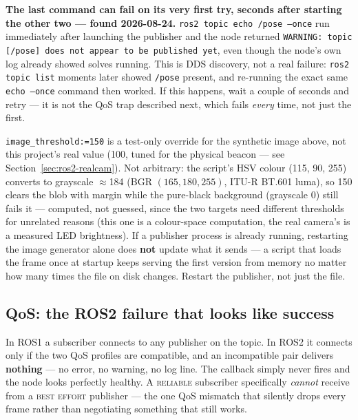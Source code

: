 \documentclass[11pt]{report}
\newenvironment{warningbox}%
  {\begin{lrbox}{\warnbox}\begin{minipage}{0.90\textwidth}}%
  {\end{minipage}\end{lrbox}%
   \begin{center}\fcolorbox{black}{codebg}{\usebox{\warnbox}}\end{center}}
\begin{document}
\begin{warningbox}
\textbf{The last command can fail on its very first try, seconds after
starting the other two --- found 2026-08-24.} \texttt{ros2 topic echo /pose
--once} run immediately after launching the publisher and the node
returned \texttt{WARNING: topic [/pose] does not appear to be published
yet}, even though the node's own log already showed solves running. This
is DDS discovery, not a real failure: \texttt{ros2 topic list} moments
later showed \texttt{/pose} present, and re-running the exact same
\texttt{echo --once} command then worked. If this happens, wait a couple of
seconds and retry --- it is not the QoS trap described next, which fails
\emph{every} time, not just the first.
\end{warningbox}

\texttt{image\_threshold:=150} is a test-only override for the synthetic
image above, not this project's real value (100, tuned for the physical
beacon --- see Section~\ref{sec:ros2-realcam}). Not arbitrary: the script's
HSV colour (115, 90, 255) converts to grayscale $\approx$184 (BGR
$(165,180,255)$, ITU-R BT.601 luma), so 150 clears the blob with margin while
the pure-black background (grayscale 0) still fails it --- computed, not
guessed, since the two targets need different thresholds for unrelated
reasons (this one is a colour-space computation, the real camera's is a
measured LED brightness). If a publisher process is already running, restarting the image
generator alone does \textbf{not} update what it sends --- a script that
loads the frame once at startup keeps serving the first version from memory
no matter how many times the file on disk changes. Restart the publisher,
not just the file.


\subsection{QoS: the ROS2 failure that looks like success}

\begin{warningbox}
In ROS1 a subscriber connects to any publisher on the topic. In ROS2 it
connects only if the two QoS profiles are compatible, and an incompatible
pair delivers \textbf{nothing} --- no error, no warning, no log line. The
callback simply never fires and the node looks perfectly healthy. A
\textsc{reliable} subscriber specifically \emph{cannot} receive from a
\textsc{best effort} publisher --- the one QoS mismatch that silently drops
every frame rather than negotiating something that still works.
\end{warningbox}
\end{document}
